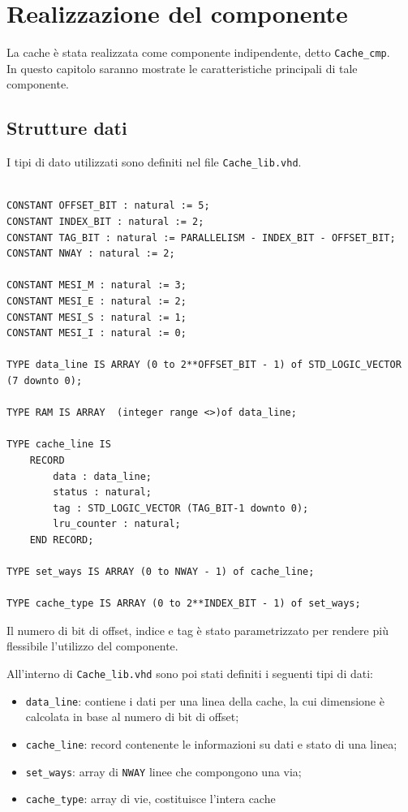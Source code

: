 \clearpage{\pagestyle{empty}\cleardoublepage}

\chapter{Realizzazione del componente}

La cache \`e stata realizzata come componente indipendente, detto \texttt{Cache\_cmp}.\\
In questo capitolo saranno mostrate le caratteristiche principali di tale componente.

\section{Strutture dati}

I tipi di dato utilizzati sono definiti nel file \texttt{Cache\_lib.vhd}.


\begin{lstlisting}

CONSTANT OFFSET_BIT : natural := 5;
CONSTANT INDEX_BIT : natural := 2;
CONSTANT TAG_BIT : natural := PARALLELISM - INDEX_BIT - OFFSET_BIT;
CONSTANT NWAY : natural := 2;

CONSTANT MESI_M : natural := 3;
CONSTANT MESI_E : natural := 2;
CONSTANT MESI_S : natural := 1;
CONSTANT MESI_I : natural := 0;

TYPE data_line IS ARRAY (0 to 2**OFFSET_BIT - 1) of STD_LOGIC_VECTOR (7 downto 0);

TYPE RAM IS ARRAY  (integer range <>)of data_line;

TYPE cache_line IS 
	RECORD
		data : data_line;
		status : natural;
		tag : STD_LOGIC_VECTOR (TAG_BIT-1 downto 0);
		lru_counter : natural;
	END RECORD;

TYPE set_ways IS ARRAY (0 to NWAY - 1) of cache_line;
		
TYPE cache_type IS ARRAY (0 to 2**INDEX_BIT - 1) of set_ways;
\end{lstlisting}


Il numero di bit di offset, indice e tag \`e stato parametrizzato per rendere pi\`u flessibile l'utilizzo del componente.

All'interno di \texttt{Cache\_lib.vhd} sono poi stati definiti i seguenti tipi di dati:
\begin{itemize}
  \item \texttt{data\_line}: contiene i dati per una linea della cache, la cui dimensione \`e calcolata in base al numero di bit di offset;
  \item \texttt{cache\_line}: record contenente le informazioni su dati e stato di una linea;
  \item \texttt{set\_ways}: array di \texttt{NWAY} linee che compongono una via;
  \item \texttt{cache\_type}: array di vie, costituisce l'intera cache
\end{itemize}


